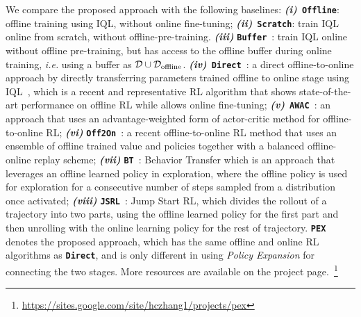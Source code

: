 \documentclass{article}
\newcommand{\alg}[1]{\textbf{\texttt{#1}}}
\begin{document}
\vspace{-0.35in}
\textbf{}
We compare the proposed approach with the following baselines:
\emph{\textbf{(i)}}~\alg{Offline}:  offline training using IQL, without online fine-tuning;
\emph{\textbf{(ii)}}~\alg{Scratch}: train IQL online from scratch, without offline-pre-training.
\emph{\textbf{(iii)}} \alg{Buffer}~\citep{use_offline_buffer}: train IQL online without offline pre-training, but has access to the offline buffer during online training, \emph{i.e.} using a buffer as $\mathcal{D}\cup\mathcal{D}_{\rm offline}$.
\emph{\textbf{(iv)}}~\alg{Direct}~\citep{iql}: a direct offline-to-online approach by directly transferring parameters trained offline to online stage using IQL~\citep{iql}, which is a recent and representative  RL algorithm that shows state-of-the-art performance on offline RL while allows online fine-tuning;
\emph{\textbf{(v)}}~\alg{AWAC}~\citep{AWAC}: an approach that uses an advantage-weighted form of actor-critic method for offline-to-online RL;
\emph{\textbf{(vi)}} \alg{Off2On}~\citep{balanced_replay}: a recent offline-to-online RL method that uses an ensemble of offline trained value and policies together with a balanced offline-online replay scheme;
\emph{\textbf{(vii)}} \alg{BT}~\citep{behavior_transfer}: Behavior Transfer which is an approach that
leverages an offline learned policy in exploration,  where the offline policy is used
for exploration for a consecutive number of steps sampled from a distribution once activated;
\emph{\textbf{(viii)}} \alg{JSRL}~\citep{jump_start_RL}: Jump Start RL, which divides the rollout of a trajectory into two parts, using the offline  learned  policy for the first part and then  unrolling with the online learning policy for the rest of trajectory.
\alg{PEX} denotes the proposed approach, which has the same offline and online RL algorithms as \alg{Direct}, and is only different in using \emph{Policy Expansion} for connecting the two stages. More resources are available on the project page.~\footnote{\scriptsize{\url{https://sites.google.com/site/hczhang1/projects/pex}}}
\end{document}
